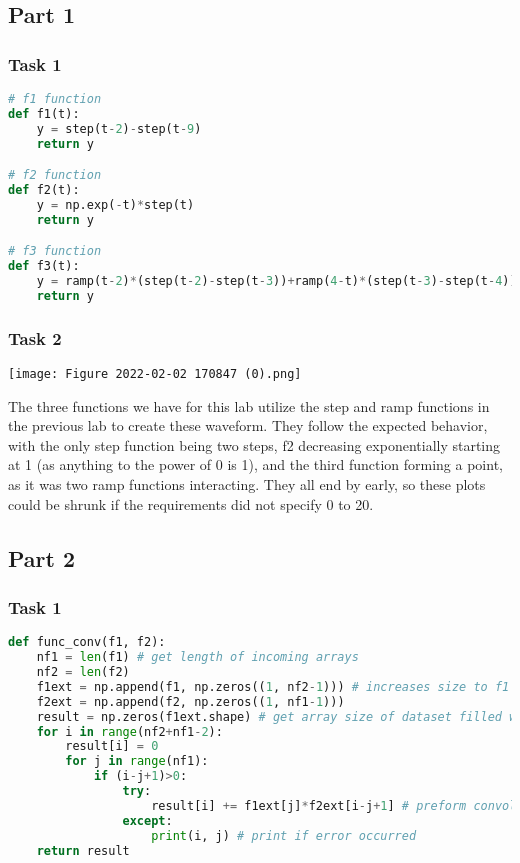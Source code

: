 \documentclass[11pt,a4]{article}
\begin{document}
\subsection{Part 1}

\subsubsection{Task 1}

\begin{lstlisting}[language=Python]
# f1 function
def f1(t):
    y = step(t-2)-step(t-9)
    return y

# f2 function
def f2(t):
    y = np.exp(-t)*step(t)
    return y

# f3 function
def f3(t):
    y = ramp(t-2)*(step(t-2)-step(t-3))+ramp(4-t)*(step(t-3)-step(t-4))
    return y
\end{lstlisting}

\subsubsection{Task 2}

\texttt{[image: Figure 2022-02-02 170847 (0).png]}

The three functions we have for this lab utilize the step and ramp functions in the previous lab to create these waveform. They follow the expected behavior, with the only step function being two steps, f2 decreasing exponentially starting at 1 (as anything to the power of 0 is 1), and the third function forming a point, as it was two ramp functions interacting. They all end by early, so these plots could be shrunk if the requirements did not specify 0 to 20.

\subsection{Part 2}

\subsubsection{Task 1}

\begin{lstlisting}[language=Python]
def func_conv(f1, f2):
    nf1 = len(f1) # get length of incoming arrays
    nf2 = len(f2)
    f1ext = np.append(f1, np.zeros((1, nf2-1))) # increases size to f1 + f2
    f2ext = np.append(f2, np.zeros((1, nf1-1)))
    result = np.zeros(f1ext.shape) # get array size of dataset filled with 0
    for i in range(nf2+nf1-2): 
        result[i] = 0
        for j in range(nf1):
            if (i-j+1)>0:
                try: 
                    result[i] += f1ext[j]*f2ext[i-j+1] # preform convolution for all values in f2 on a point in f1
                except:
                    print(i, j) # print if error occurred
    return result
\end{lstlisting}
\end{document}
